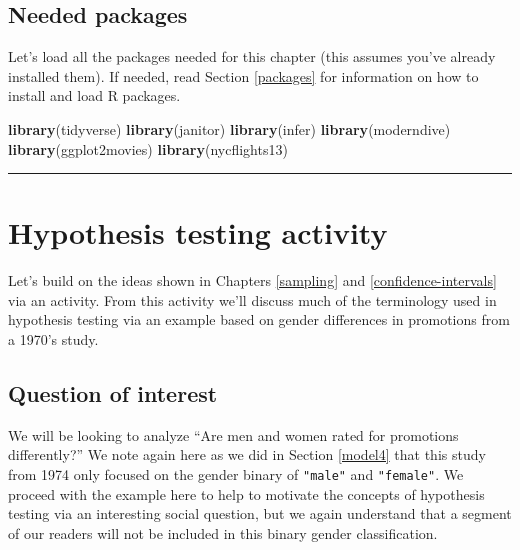 \documentclass[12pt, krantz2,]{krantz}
\makeatletter
\newenvironment{Shaded}{\begin{snugshade}}{\end{snugshade}}
\newcommand{\KeywordTok}[1]{\textcolor[rgb]{0.27,0.27,0.27}{\textbf{#1}}}
\newcommand{\NormalTok}[1]{#1}
\newenvironment{kframe}{%
\medskip{}
\setlength{\fboxsep}{.8em}
 \def\at@end@of@kframe{}%
 \ifinner\ifhmode%
  \def\at@end@of@kframe{\end{minipage}}%
  \begin{minipage}{\columnwidth}%
 \fi\fi%
 \def\FrameCommand##1{\hskip\@totalleftmargin \hskip-\fboxsep
 \colorbox{shadecolor}{##1}\hskip-\fboxsep
     \hskip-\linewidth \hskip-\@totalleftmargin \hskip\columnwidth}%
 \MakeFramed {\advance\hsize-\width
   \@totalleftmargin\z@ \linewidth\hsize
   \@setminipage}}%
 {\par\unskip\endMakeFramed%
 \at@end@of@kframe}
\renewenvironment{Shaded}{\begin{kframe}}{\end{kframe}}
\makeatother
\begin{document}
\hypertarget{needed-packages-7}{%
\subsection*{Needed packages}\label{needed-packages-7}}


Let's load all the packages needed for this chapter (this assumes you've already installed them). If needed, read Section \ref{packages} for information on how to install and load R packages.

\begin{Shaded}
\begin{Highlighting}[]
\KeywordTok{library}\NormalTok{(tidyverse)}
\KeywordTok{library}\NormalTok{(janitor)}
\KeywordTok{library}\NormalTok{(infer)}
\KeywordTok{library}\NormalTok{(moderndive)}
\KeywordTok{library}\NormalTok{(ggplot2movies)}
\KeywordTok{library}\NormalTok{(nycflights13)}
\end{Highlighting}
\end{Shaded}

\begin{center}\rule{0.5\linewidth}{\linethickness}\end{center}

\hypertarget{ht-activity}{%
\section{Hypothesis testing activity}\label{ht-activity}}

Let's build on the ideas shown in Chapters \ref{sampling} and \ref{confidence-intervals} via an activity. From this activity we'll discuss much of the terminology used in hypothesis testing via an example based on gender differences in promotions from a 1970's study.

\hypertarget{question-of-interest}{%
\subsection{Question of interest}\label{question-of-interest}}

We will be looking to analyze ``Are men and women rated for promotions differently?'' We note again here as we did in Section \ref{model4} that this study from 1974 only focused on the gender binary of \texttt{"male"} and \texttt{"female"}. We proceed with the example here to help to motivate the concepts of hypothesis testing via an interesting social question, but we again understand that a segment of our readers will not be included in this binary gender classification.
\end{document}
